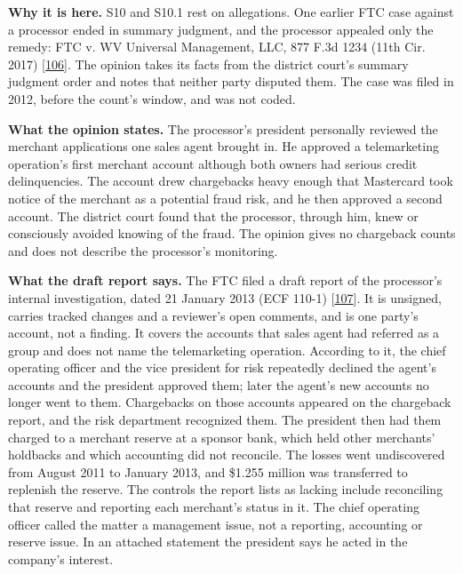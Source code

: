 \documentclass[
  11pt,
]{article}
\begin{document}
\textbf{Why it is here.} S10 and S10.1 rest on allegations. One earlier
FTC case against a processor ended in summary judgment, and the
processor appealed only the remedy: FTC v. WV Universal Management, LLC,
877 F.3d 1234 (11th Cir. 2017)
{[}\protect\hyperlink{ref-EleventhCir2017Universal}{106}{]}. The opinion
takes its facts from the district court's summary judgment order and
notes that neither party disputed them. The case was filed in 2012,
before the count's window, and was not coded.

\textbf{What the opinion states.} The processor's president personally
reviewed the merchant applications one sales agent brought in. He
approved a telemarketing operation's first merchant account although
both owners had serious credit delinquencies. The account drew
chargebacks heavy enough that Mastercard took notice of the merchant as
a potential fraud risk, and he then approved a second account. The
district court found that the processor, through him, knew or
consciously avoided knowing of the fraud. The opinion gives no
chargeback counts and does not describe the processor's monitoring.

\textbf{What the draft report says.} The FTC filed a draft report of the
processor's internal investigation, dated 21 January 2013 (ECF 110-1)
{[}\protect\hyperlink{ref-Universal2013FindingReport}{107}{]}. It is
unsigned, carries tracked changes and a reviewer's open comments, and is
one party's account, not a finding. It covers the accounts that sales
agent had referred as a group and does not name the telemarketing
operation. According to it, the chief operating officer and the vice
president for risk repeatedly declined the agent's accounts and the
president approved them; later the agent's new accounts no longer went
to them. Chargebacks on those accounts appeared on the chargeback
report, and the risk department recognized them. The president then had
them charged to a merchant reserve at a sponsor bank, which held other
merchants' holdbacks and which accounting did not reconcile. The losses
went undiscovered from August 2011 to January 2013, and \$1.255 million
was transferred to replenish the reserve. The controls the report lists
as lacking include reconciling that reserve and reporting each
merchant's status in it. The chief operating officer called the matter a
management issue, not a reporting, accounting or reserve issue. In an
attached statement the president says he acted in the company's
interest.
\end{document}
